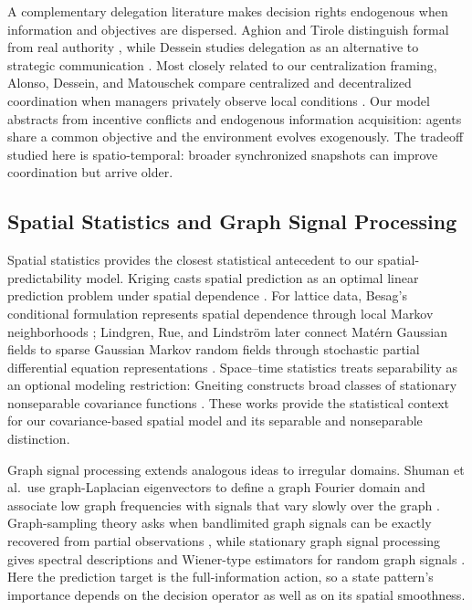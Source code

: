 \documentclass[11pt]{article}
\begin{document}
A complementary delegation literature makes decision rights endogenous when information and objectives are dispersed. Aghion and Tirole distinguish formal from real authority \cite{aghion1997formal}, while Dessein studies delegation as an alternative to strategic communication \cite{dessein2002authority}. Most closely related to our centralization framing, Alonso, Dessein, and Matouschek compare centralized and decentralized coordination when managers privately observe local conditions \cite{alonso2008coordination}. Our model abstracts from incentive conflicts and endogenous information acquisition: agents share a common objective and the environment evolves exogenously. The tradeoff studied here is spatio-temporal: broader synchronized snapshots can improve coordination but arrive older. 

\subsection{Spatial Statistics and Graph Signal Processing}
\label{subsec:related_spatial}

Spatial statistics provides the closest statistical antecedent to our spatial-predictability model. Kriging casts spatial prediction as an optimal linear prediction problem under spatial dependence \cite{cressie1990origins}. For lattice data, Besag's conditional formulation represents spatial dependence through local Markov neighborhoods \cite{besag1974spatial}; Lindgren, Rue, and Lindstr\"om later connect Mat\'ern Gaussian fields to sparse Gaussian Markov random fields through stochastic partial differential equation representations \cite{lindgren2011explicit}. Space--time statistics treats separability as an optional modeling restriction: Gneiting constructs broad classes of stationary nonseparable covariance functions \cite{gneiting2002nonseparable}. These works provide the statistical context for our covariance-based spatial model and its separable and nonseparable distinction.

Graph signal processing extends analogous ideas to irregular domains. Shuman et al.\ use graph-Laplacian eigenvectors to define a graph Fourier domain and associate low graph frequencies with signals that vary slowly over the graph \cite{shuman2013emerging}. Graph-sampling theory asks when bandlimited graph signals can be exactly recovered from partial observations \cite{chen2015discrete}, while stationary graph signal processing gives spectral descriptions and Wiener-type estimators for random graph signals \cite{perraudin2017stationary}. Here the prediction target is the full-information action, so a state pattern's
importance depends on the decision operator as well as on its spatial smoothness.
\end{document}
